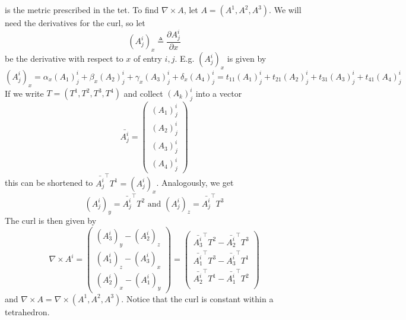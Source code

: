 \documentclass[../thesis.tex]{subfiles}
\begin{document}
is the metric prescribed in the tet. To find $\nabla \times A$, let
$A = (A^1, A^2, A^3)$. We will need the derivatives for the curl, so let
$$(A^i_j)_x \triangleq \frac{\partial A^i_j}{\partial x}$$ be the derivative with respect to $x$ of entry $i,j$.
E.g. $(A^i_j)_x$ is given by
$$(A^i_j)_x = \alpha_x (A_1)^i_j + \beta_x (A_2)^i_j + \gamma_x (A_3)^i_j + \delta_x (A_4)^i_j = t_{11}(A_1)^i_j + t_{21}(A_2)^i_j + t_{31}(A_3)^i_j + t_{41}(A_4)^i_j$$
If we write $T= (T^1, T^2, T^3, T^4)$ and collect $(A_k)^i_j$ into a vector
$$\bar{A^i_j}=\begin{pmatrix}
  (A_1)^i_j \\ (A_2)^i_j \\ (A_3)^i_j \\ (A_4)^i_j
\end{pmatrix}$$
this can be shortened to $\bar{A^i_j}^{\top}T^1 = (A^i_j)_x$.
Analogously, we get
$$(A^i_j)_y = \bar{A^i_j}^{\top}T^2  \text{ and } (A^i_j)_z = \bar{A^i_j}^{\top}T^3$$
The curl is then given by
$$\nabla \times A^i = \begin{pmatrix}
  (A^i_3)_y - (A^i_2)_z \\
  (A^i_1)_z - (A^i_3)_x \\
  (A^i_2)_x - (A^i_1)_y
\end{pmatrix} =
\begin{pmatrix}
  \bar{A^i_3}^{\top}T^2 - \bar{A^i_2}^{\top}T^3\\
  \bar{A^i_1}^{\top}T^3 - \bar{A^i_3}^{\top}T^1\\
  \bar{A^i_2}^{\top}T^1 - \bar{A^i_1}^{\top}T^2\\
\end{pmatrix}$$
and $\nabla \times A = \nabla \times (A^1, A^2, A^3)$.
Notice that the curl is constant within a tetrahedron.
\end{document}
